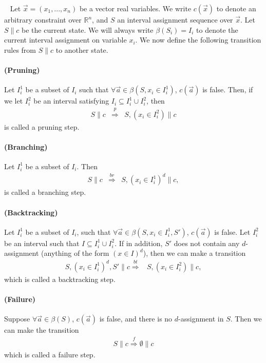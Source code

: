 \documentclass[envcountsect]{llncs}
\begin{document}
\begin{definition}~\label{transitions} Let $\vec x =
(x_1,...,x_n)$ be a vector real variables. We write $c(\vec x)$ to denote an
arbitrary constraint over $\mathbb{R}^n$, and
$S$ an interval assignment sequence over $\vec x$. Let $S\parallel c$ be the
current state. We will always write $\beta(S_i) = I_i$ to denote the current
interval assignment on variable $x_i$. We now define the following transition
rules from $S\parallel c$ to another state. 
\paragraph{(Pruning)} Let $I_i^1$ be a subset of $I_i$ such that $\forall \vec
a\in \beta(S,x_i\in I_i^1)$, $c(\vec a)$ is false. Then, if we let $I_i^2$ be an
interval satisfying $I_i\subseteq I_i^1 \cup I_i^2$, then 
\begin{eqnarray*}
S\parallel c &\stackrel{p}{\Longrightarrow}& S, (x_i\in I_i^2)\parallel c
\end{eqnarray*}
is called a pruning step. 
\paragraph{(Branching)}Let $I_i^1$ be a subset of $I_i$. Then
\begin{eqnarray*}
S\parallel c &\stackrel{br}{\Longrightarrow}& S, (x_i\in I_i^1)^d \parallel c,
\end{eqnarray*}
is called a branching step. 

\paragraph{(Backtracking)} Let $I_i^1$ be a subset of $I_i$, such that $\forall
\vec a\in \beta(S,x_i\in I_i^1, S')$, $c(\vec a)$ is false. Let $I_i^2$ be an
interval such that $I\subseteq I_i^1\cup I_i^2$. If in addition, $S'$ does not
contain any $d$-assignment (anything of the form $(x\in I)^d$), then we can make
a transition
\begin{eqnarray*}
S, (x_i\in I_i^1)^d, S'\parallel c \stackrel{bt}{\Longrightarrow}& S, (x_i\in
 I_i^2) \parallel c,
\end{eqnarray*}
which is called a backtracking step. 

\paragraph{(Failure)} Suppose $\forall \vec a\in \beta(S)$, $c(\vec a)$ is
false, and there is no $d$-assignment in $S$. Then we can make the transition
\begin{eqnarray*}
S\parallel c \stackrel{f}{\Longrightarrow} \emptyset\parallel c
\end{eqnarray*}
which is called a failure step. 
\end{definition}
\end{document}
